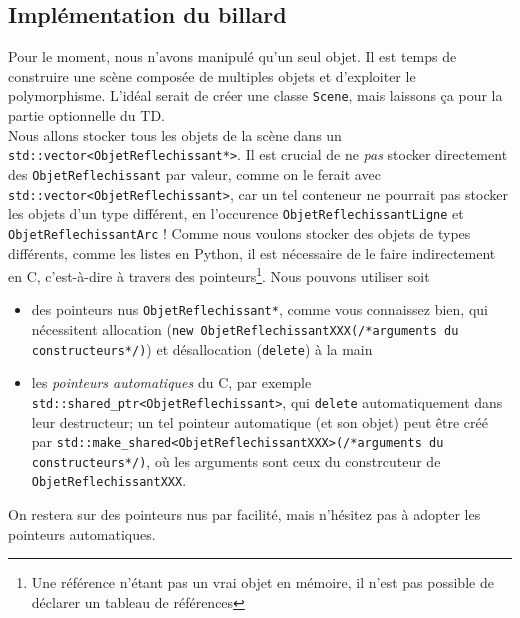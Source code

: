 \documentclass{book}
\newcommand{\inline}[1]{\texttt{#1}}
\newcommand{\cpp}{\mbox{C\vspace{.5em}\protect\raisebox{.2ex}{\footnotesize++~}}}
\begin{document}
\subsection{Implémentation du billard}

Pour le moment, nous n'avons manipulé qu'un seul objet. Il est temps de construire une scène composée de multiples objets et d'exploiter le polymorphisme. L'idéal serait de créer une classe \inline{Scene}, mais laissons ça pour la partie optionnelle du TD.\\

Nous allons stocker tous les objets de la scène dans un \inline{std::vector<ObjetReflechissant*>}. Il est crucial de ne \emph{pas} stocker directement des \inline{ObjetReflechissant} par valeur, comme on le ferait avec \inline{std::vector<ObjetReflechissant>}, car un tel conteneur ne pourrait pas stocker les objets d'un type différent, en l'occurence \inline{ObjetReflechissantLigne} et \inline{ObjetReflechissantArc} ! Comme nous voulons stocker des objets de types différents, comme les listes en Python, il est nécessaire de le faire indirectement en \cpp, c'est-à-dire à travers des pointeurs\footnote{Une référence n'étant pas un vrai objet en mémoire, il n'est pas possible de déclarer un tableau de références}. Nous pouvons utiliser soit
\begin{itemize}
  \item des pointeurs nus \inline{ObjetReflechissant*}, comme vous connaissez bien, qui nécessitent allocation (\inline{new ObjetReflechissantXXX(/*arguments du constructeurs*/)}) et désallocation (\inline{delete}) à la main
  \item les \emph{pointeurs automatiques} du \cpp, par exemple \inline{std::shared_ptr<ObjetReflechissant>}, qui \inline{delete} automatiquement dans leur destructeur; un tel pointeur automatique (et son objet) peut être créé par \inline{std::make_shared<ObjetReflechissantXXX>(/*arguments du constructeurs*/)}, où les arguments sont ceux du constrcuteur de \inline{ObjetReflechissantXXX}.
\end{itemize}
On restera sur des pointeurs nus par facilité, mais n'hésitez pas à adopter les pointeurs automatiques.

\end{document}
